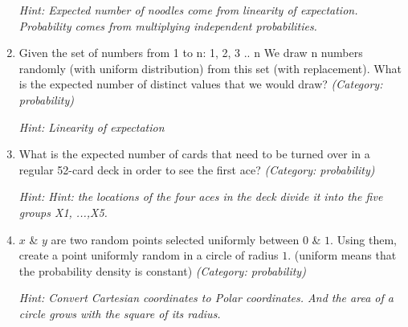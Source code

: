 \begin{enumerate}
\small\emph{Hint: Expected number of noodles come from linearity of expectation. Probability comes from multiplying independent probabilities.}





\item Given the set of numbers from 1 to n: { 1, 2, 3 .. n } We draw n numbers randomly (with uniform distribution) from this set (with replacement). What is the expected number of distinct values that we would draw?
\small\emph{(Category: probability)}

\small\emph{Hint: Linearity of expectation}





\item What is the expected number of cards that need to be turned over in a regular 52-card deck in order to see the first ace?
\small\emph{(Category: probability)}

\small\emph{Hint: Hint: the locations of the four aces in the deck divide it into the five groups X1, ...,X5.}





\item $x$ \& $y$ are two random points selected uniformly between $0$ \& $1$. Using them, create a point uniformly random in a circle of radius $1$. (uniform means that the probability density is constant)
\small\emph{(Category: probability)}

\small\emph{Hint: Convert Cartesian coordinates to Polar coordinates. And the area of a circle grows with the square of its radius.}






\end{enumerate}
